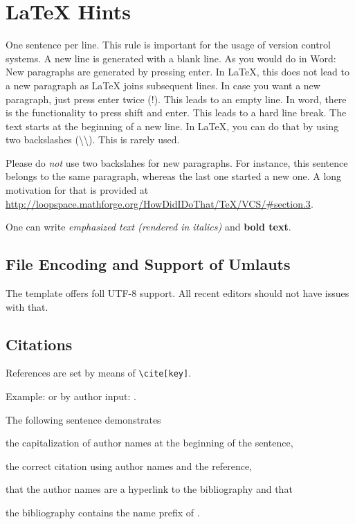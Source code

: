 \chapter{LaTeX Hints}
\label{chap:latexhints}

One sentence per line.
This rule is important for the usage of version control systems.
A new line is generated with a blank line.
As you would do in Word:
New paragraphs are generated by pressing enter.
In LaTeX, this does not lead to a new paragraph as LaTeX joins subsequent lines.
In case you want a new paragraph, just press enter twice (!).
This leads to an empty line.
In word, there is the functionality to press shift and enter.
This leads to a hard line break.
The text starts at the beginning of a new line.
In LaTeX, you can do that by using two backslashes (\textbackslash\textbackslash).
This is rarely used.

Please do \textit{not} use two backslahes for new paragraphs.
For instance, this sentence belongs to the same paragraph, whereas the last one started a new one.
A long motivation for that is provided at \url{http://loopspace.mathforge.org/HowDidIDoThat/TeX/VCS/#section.3}.

One can write \emph{emphasized text (rendered in italics)} and \textbf{bold text}.

\section{File Encoding and Support of Umlauts}
\label{sec:firstsectioninlatexhints}
The template offers foll UTF-8 support.
All recent editors should not have issues with that.

\section{Citations}


References are set by means of \texttt{\textbackslash cite[key]}.

\begin{filecontents*}{\democodefile}
Example: \cite{WSPA} or by author input: \citet{WSPA}.
\end{filecontents*}

The following sentence demonstrates
\begin{inparaenum}[1.]
  \item the capitalization of author names at the beginning of the sentence,
  \item the correct citation using author names and the reference,
  \item that the author names are a hyperlink to the bibliography and that
  \item the bibliography contains the name prefix  of .
\end{inparaenum}

